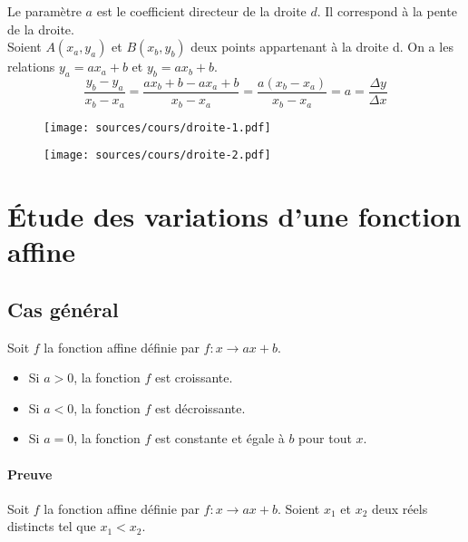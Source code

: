 \documentclass[paper=a4, fontsize=9pt]{scrartcl} %
\begin{document}
Le paramètre $a$ est le coefficient directeur de la droite $d$. Il correspond à la pente de la droite.\\
Soient $A(x_a, y_a)$ et $B(x_b, y_b)$ deux points appartenant à la droite d. On a les relations $y_a = ax_a + b$ et $y_b = ax_b + b$.
$$\dfrac{y_b - y_a}{x_b - x_a} = \dfrac{ax_b + b - ax_a + b}{x_b - x_a} = \dfrac{a(x_b - x_a)}{x_b - x_a} = a = \dfrac{\Delta y}{\Delta x}$$

\begin{multicols}{2}
  \begin{figure}[H]
    \centering
    \texttt{[image: sources/cours/droite-1.pdf]}
  \end{figure}

  \begin{figure}[H]
    \centering
    \texttt{[image: sources/cours/droite-2.pdf]}
  \end{figure}
\end{multicols}

\newpage

\section{Étude des variations d'une fonction affine}

\subsection{Cas général}

\begin{Proposition}
  Soit $f$ la fonction affine définie par $f : x \to ax + b$.
  \begin{itemize}
  \item Si $a > 0$, la fonction $f$ est croissante.
  \item Si $a < 0$, la fonction $f$ est décroissante.
  \item Si $a = 0$, la fonction $f$ est constante et égale à $b$ pour tout $x$. 
  \end{itemize}
\end{Proposition}

\paragraph{Preuve}
Soit $f$ la fonction affine définie par $f : x \to ax + b$.
Soient $x_1$ et $x_2$ deux réels distincts tel que $x_1 < x_2$.
\end{document}
